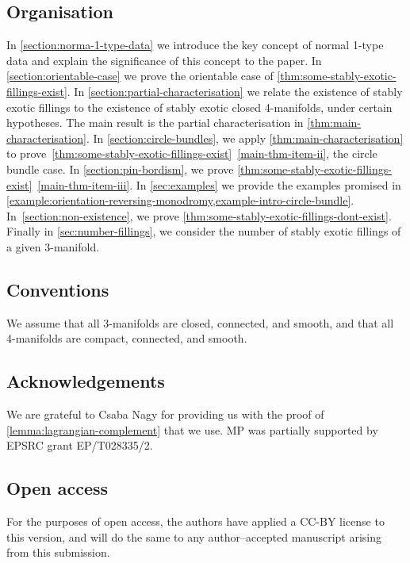 \documentclass[a4paper, reqno]{amsart}
\theoremstyle{definition}
\theoremstyle{remark}
\begin{document}
\subsection*{Organisation}
In \cref{section:norma-1-type-data} we introduce the key concept of normal 1-type data and explain the significance of this concept to the paper.
In \cref{section:orientable-case} we prove the orientable case of \cref{thm:some-stably-exotic-fillings-exist}.
In \cref{section:partial-characterisation} we relate the existence of stably exotic fillings to the existence of stably exotic closed 4-manifolds, under certain hypotheses. The main result is the partial characterisation in \cref{thm:main-characterisation}. In \cref{section:circle-bundles}, we apply \cref{thm:main-characterisation} to prove~\cref{thm:some-stably-exotic-fillings-exist}~\eqref{main-thm-item-ii}, the circle bundle case. In \cref{section:pin-bordism}, we prove \cref{thm:some-stably-exotic-fillings-exist}~\eqref{main-thm-item-iii}. 
In \cref{sec:examples} we provide the examples promised in \cref{example:orientation-reversing-monodromy,example-intro-circle-bundle}. 
In~\cref{section:non-existence}, we prove \cref{thm:some-stably-exotic-fillings-dont-exist}. Finally in \cref{sec:number-fillings}, we consider the number of stably exotic fillings of a given $3$-manifold.

\subsection*{Conventions}

We assume that all 3-manifolds are closed, connected, and smooth, and that all 4-manifolds are compact, connected, and smooth.

\subsection*{Acknowledgements}

We are grateful to Csaba Nagy for providing us with the proof of \cref{lemma:lagrangian-complement} that we use. 
MP was partially supported by EPSRC grant EP/T028335/2.

\subsection*{Open access}

For the purposes of open access, the authors have applied a CC-BY license to this version, and will do the same to any author--accepted manuscript arising from this submission.
\end{document}

